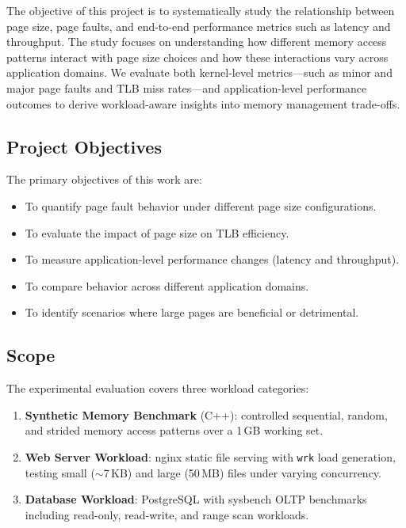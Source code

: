 \documentclass[conference]{IEEEtran}
\begin{document}
The objective of this project is to systematically study the relationship between page size, page faults, and end-to-end performance metrics such as latency and throughput. The study focuses on understanding how different memory access patterns interact with page size choices and how these interactions vary across application domains. We evaluate both kernel-level metrics---such as minor and major page faults and TLB miss rates---and application-level performance outcomes to derive workload-aware insights into memory management trade-offs.

\subsection{Project Objectives}

The primary objectives of this work are:
\begin{itemize}
    \item To quantify page fault behavior under different page size configurations.
    \item To evaluate the impact of page size on TLB efficiency.
    \item To measure application-level performance changes (latency and throughput).
    \item To compare behavior across different application domains.
    \item To identify scenarios where large pages are beneficial or detrimental.
\end{itemize}

\subsection{Scope}

The experimental evaluation covers three workload categories:

\begin{enumerate}
    \item \textbf{Synthetic Memory Benchmark} (C++): controlled sequential, random, and strided memory access patterns over a 1\,GB working set.
    \item \textbf{Web Server Workload}: nginx static file serving with \texttt{wrk} load generation, testing small ($\sim$7\,KB) and large (50\,MB) files under varying concurrency.
    \item \textbf{Database Workload}: PostgreSQL with sysbench OLTP benchmarks including read-only, read-write, and range scan workloads.
\end{enumerate}
\end{document}
